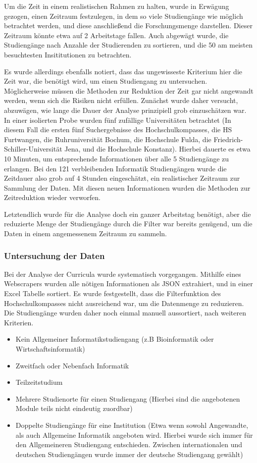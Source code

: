 Um die Zeit in einem realistischen Rahmen zu halten, wurde in Erwägung gezogen, einen Zeitraum festzulegen, in dem so viele Studiengänge wie möglich betrachtet werden, und diese anschließend die Forschungsmenge darstellen. Dieser Zeitraum könnte etwa auf 2 Arbeitstage fallen. Auch abgewägt wurde, die Studiengänge nach Anzahle der Studierenden zu sortieren, und die 50 am meisten besuchtesten Insititutionen zu betrachten.

Es wurde allerdings ebenfalls notiert, dass das ungewisseste Kriterium hier die Zeit war, die benötigt wird, um einen Studiengang zu untersuchen. Möglicherweise müssen die Methoden zur Reduktion der Zeit gar nicht angewandt werden, wenn sich die Risiken nicht erfüllen. Zunächst wurde daher versucht, abzuwägen, wie lange die Dauer der Analyse prinzipiell grob einzuschätzen war.
In einer isolierten Probe wurden fünf zufällige Universitäten betrachtet (In diesem Fall die ersten fünf Suchergebnisse des Hochschulkompasses, die HS Furtwangen, die Ruhruniversität Bochum, die Hochschule Fulda, die Friedrich-Schiller-Universität Jena, und die Hochschule Konstanz).
Hierbei dauerte es etwa 10 Minuten, um entsprechende Informationen über alle 5 Studiengänge zu erlangen.
Bei den 121 verbleibenden Informatik Studiengängen wurde die Zeitdauer also grob auf 4 Stunden eingeschätzt, ein realistischer Zeitraum zur Sammlung der Daten. Mit diesen neuen Informationen wurden die Methoden zur Zeitreduktion wieder verworfen.

Letztendlich wurde für die Analyse doch ein ganzer Arbeitstag benötigt, aber die reduzierte Menge der Studiengänge durch die Filter war bereits genügend, um die Daten in einem angemessenem Zeitraum zu sammeln.

\subsubsection{Untersuchung der Daten}\label{sec:sorting}
Bei der Analyse der Curricula wurde systematisch vorgegangen. Mithilfe eines Webscrapers wurden alle nötigen Informationen als JSON extrahiert, und in einer Excel Tabelle sortiert.
Es wurde festgestellt, dass die Filterfunktion des Hochschulkompasses nicht ausreichend war, um die Datenmenge zu reduzieren. Die Studiengänge wurden daher noch einmal manuell aussortiert, nach weiteren Kriterien.

\begin{itemize}
    \item Kein Allgemeiner Informatikstudiengang (z.B Bioinformatik oder Wirtschaftsinformatik)
    \item Zweitfach oder Nebenfach Informatik
    \item Teilzeitstudium
    \item Mehrere Studienorte für einen Studiengang (Hierbei sind die angebotenen Module teils nicht eindeutig zuordbar)
    \item Doppelte Studiengänge für eine Institution (Etwa wenn sowohl Angewandte, als auch Allgemeine Informatik angeboten wird. Hierbei wurde sich immer für den Allgemeineren Studiengang entschieden. Zwischen internationalen und deutschen Studiengängen wurde immer der deutsche Studiengang gewählt)
\end{itemize}

